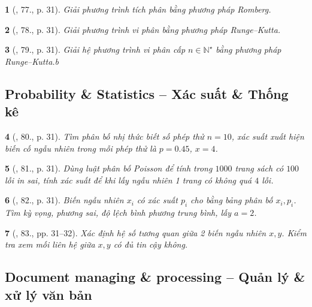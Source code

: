 \documentclass{article}
\newtheorem{baitoan}{}
\begin{document}
\begin{baitoan}[\cite{Doanh_Tuan_Pascal}, 77., p. 31]
	Giải phương trình tích phân bằng phương pháp Romberg.
\end{baitoan}

\begin{baitoan}[\cite{Doanh_Tuan_Pascal}, 78., p. 31]
	Giải phương trình vi phân bằng phương pháp Runge--Kutta.
\end{baitoan}

\begin{baitoan}[\cite{Doanh_Tuan_Pascal}, 79., p. 31]
	Giải hệ phương trình vi phân cấp $n\in\mathbb{N}^\star$ bằng phương pháp Runge--Kutta.b
\end{baitoan}


\subsection{Probability \& Statistics -- Xác suất \& Thống kê}

\begin{baitoan}[\cite{Doanh_Tuan_Pascal}, 80., p. 31]
	Tìm phân bố nhị thức biết số phép thử $n = 10$, xác suất xuất hiện biến cố ngẫu nhiên trong mỗi phép thử là $p = 0.45$, $x = 4$.
\end{baitoan}

\begin{baitoan}[\cite{Doanh_Tuan_Pascal}, 81., p. 31]
	Dùng luật phân bố Poisson để tính trong $1000$ trang sách có $100$ lỗi in sai, tính xác suất để khi lấy ngẫu nhiên 1 trang có không quá $4$ lỗi.
\end{baitoan}

\begin{baitoan}[\cite{Doanh_Tuan_Pascal}, 82., p. 31]
	Biến ngẫu nhiên $x_i$ có xác suất $p_i$ cho bằng bảng phân bố $x_i,p_i$. Tìm kỳ vọng, phương sai, độ lệch bình phương trung bình, lấy $a = 2$.
\end{baitoan}

\begin{baitoan}[\cite{Doanh_Tuan_Pascal}, 83., pp. 31--32]
	Xác định hệ số tương quan giữa 2 biến ngẫu nhiên $x,y$. Kiểm tra xem mối liên hệ giữa $x,y$ có đủ tin cậy không.
\end{baitoan}


\subsection{Document managing \& processing -- Quản lý \& xử lý văn bản}
\end{document}
